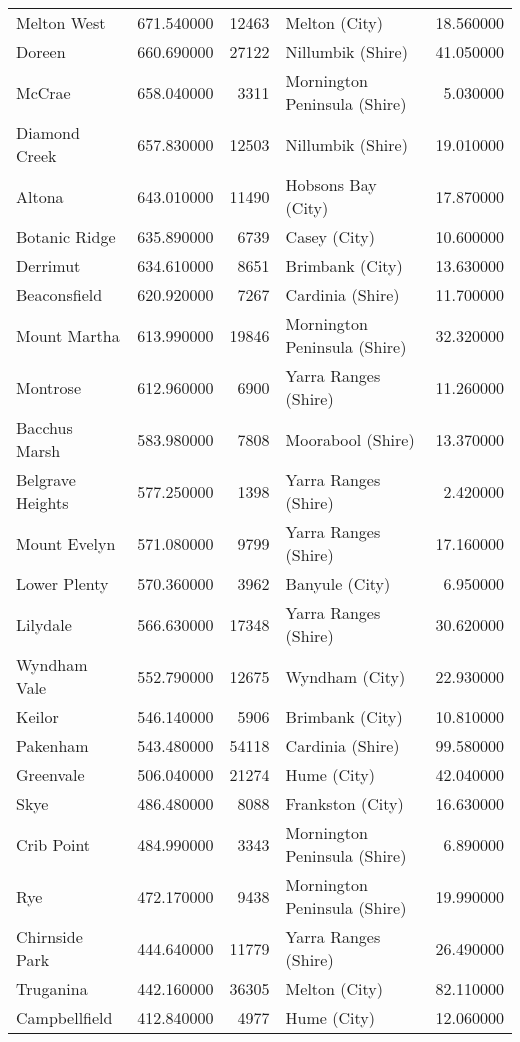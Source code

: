 \begin{table}
\begin{tabular}{lrrlr}
Melton West & 671.540000 & 12463 & Melton (City) & 18.560000 \\
Doreen & 660.690000 & 27122 & Nillumbik (Shire) & 41.050000 \\
McCrae & 658.040000 & 3311 & Mornington Peninsula (Shire) & 5.030000 \\
Diamond Creek & 657.830000 & 12503 & Nillumbik (Shire) & 19.010000 \\
Altona & 643.010000 & 11490 & Hobsons Bay (City) & 17.870000 \\
Botanic Ridge & 635.890000 & 6739 & Casey (City) & 10.600000 \\
Derrimut & 634.610000 & 8651 & Brimbank (City) & 13.630000 \\
Beaconsfield & 620.920000 & 7267 & Cardinia (Shire) & 11.700000 \\
Mount Martha & 613.990000 & 19846 & Mornington Peninsula (Shire) & 32.320000 \\
Montrose & 612.960000 & 6900 & Yarra Ranges (Shire) & 11.260000 \\
Bacchus Marsh & 583.980000 & 7808 & Moorabool (Shire) & 13.370000 \\
Belgrave Heights & 577.250000 & 1398 & Yarra Ranges (Shire) & 2.420000 \\
Mount Evelyn & 571.080000 & 9799 & Yarra Ranges (Shire) & 17.160000 \\
Lower Plenty & 570.360000 & 3962 & Banyule (City) & 6.950000 \\
Lilydale & 566.630000 & 17348 & Yarra Ranges (Shire) & 30.620000 \\
Wyndham Vale & 552.790000 & 12675 & Wyndham (City) & 22.930000 \\
Keilor & 546.140000 & 5906 & Brimbank (City) & 10.810000 \\
Pakenham & 543.480000 & 54118 & Cardinia (Shire) & 99.580000 \\
Greenvale & 506.040000 & 21274 & Hume (City) & 42.040000 \\
Skye & 486.480000 & 8088 & Frankston (City) & 16.630000 \\
Crib Point & 484.990000 & 3343 & Mornington Peninsula (Shire) & 6.890000 \\
Rye & 472.170000 & 9438 & Mornington Peninsula (Shire) & 19.990000 \\
Chirnside Park & 444.640000 & 11779 & Yarra Ranges (Shire) & 26.490000 \\
Truganina & 442.160000 & 36305 & Melton (City) & 82.110000 \\
Campbellfield & 412.840000 & 4977 & Hume (City) & 12.060000 \\

\end{tabular}
\end{table}
